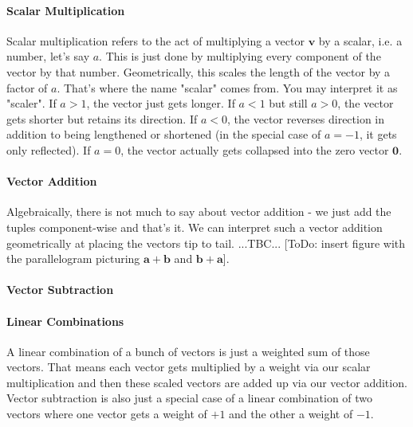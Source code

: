 \paragraph{Scalar Multiplication}
Scalar multiplication refers to the act of multiplying a vector $\mathbf{v}$ by a scalar, i.e. a number, let's say $a$. This is just done by multiplying every component of the vector by that number. Geometrically, this scales the length of the vector by a factor of $a$. That's where the name "scalar" comes from. You may interpret it as "scaler". If $a > 1$, the vector just gets longer. If $a < 1$ but still $a > 0$, the vector gets shorter but retains its direction. If $a < 0$, the vector reverses direction in addition to being lengthened or shortened (in the special case of $a=-1$, it gets only reflected). If $a = 0$, the vector actually gets collapsed into the zero vector $\mathbf{0}$.

\paragraph{Vector Addition}
Algebraically, there is not much to say about vector addition - we just add the tuples component-wise and that's it. We can interpret such a vector addition geometrically at placing the vectors tip to tail. ...TBC... [ToDo: insert figure with the parallelogram picturing $\mathbf{a + b}$ and $\mathbf{b + a}$].

% 

\paragraph{Vector Subtraction}


\paragraph{Linear Combinations}
A linear combination of a bunch of vectors is just a weighted sum of those vectors. That means each vector gets multiplied by a weight via our scalar multiplication and then these scaled vectors are added up via our vector addition. Vector subtraction is also just a special case of a linear combination of two vectors where one vector gets a weight of $+1$ and the other a weight of $-1$. 



